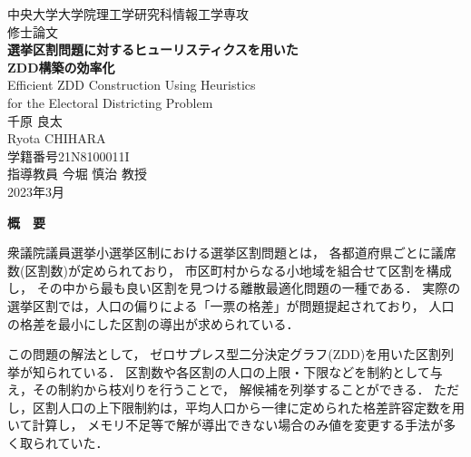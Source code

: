 ﻿\documentclass[a4j,12pt]{jreport}
\begin{document}
\thispagestyle{empty}
\begin{center}
\begin{Large}
\vspace*{0.7cm}
{\large 中央大学大学院理工学研究科情報工学専攻\\修士論文}\\
\vspace*{2.3cm}
{\bf 選挙区割問題に対するヒューリスティクスを用いた\\ZDD構築の効率化}\\
\vspace*{0.7cm}
{\sf Efficient ZDD Construction Using Heuristics \\for the Electoral Districting Problem}\\
\vspace*{5cm}
千原 良太\\
Ryota CHIHARA\\
学籍番号\hspace*{1zw}21N8100011I\\
\vspace*{2.5cm}
指導教員\hspace*{1zw} 今堀 慎治 教授\\
\vspace*{2.5cm}
2023年3月\\
\end{Large}
\end{center}


\newpage
\renewcommand{\baselinestretch}{1.25} \selectfont
{}


\begin{center} {\large \bf{概　要}} \end{center}

衆議院議員選挙小選挙区制における選挙区割問題とは，
各都道府県ごとに議席数(区割数)が定められており，
市区町村からなる小地域を組合せて区割を構成し，
その中から最も良い区割を見つける離散最適化問題の一種である．
実際の選挙区割では，人口の偏りによる「一票の格差」が問題提起されており，
人口の格差を最小にした区割の導出が求められている．

この問題の解法として，
ゼロサプレス型二分決定グラフ(ZDD)を用いた区割列挙が知られている．
区割数や各区割の人口の上限・下限などを制約として与え，その制約から枝刈りを行うことで，
解候補を列挙することができる．
ただし，区割人口の上下限制約は，平均人口から一律に定められた格差許容定数を用いて計算し，
メモリ不足等で解が導出できない場合のみ値を変更する手法が多く取られていた．
\end{document}
